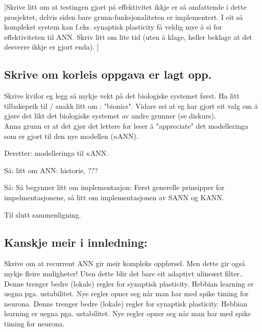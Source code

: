 
[Skrive litt om at testingen gjort på effektivitet ikkje er så omfattende i dette prosjektet, delvis siden bare grunn-funksjonaliteten er implementert.
I eit så komplekst system kan f.eks. synaptisk plasticity få veldig mye å si for effektiviteten til ANN. Skriv litt om lite tid (uten å klage, heller beklage at det desverre ikkje er gjort enda).
]

\subsection{Skrive om korleis oppgava er lagt opp.}
Skrive kvifor eg legg så mykje vekt på det biologiske systemet først. Ha litt tilbakepeik til / snakk litt om : "bionics". Vidare sei at eg har gjort eit valg om å gjøre det likt det biologiske systemet av andre grunner (se diskurs).\\
Anna grunn er at det gjør det lettere for leser å "appreciate" det modelleringa som er gjort til den nye modellen ($\kappa$ANN).

Deretter: modelleringa til $\kappa$ANN.

Så: litt om ANN: historie, ???

Så: Så begynner litt om implementasjon: Først generelle prinsipper for impelmentasjonene, så litt om implementasjonen av SANN og KANN.

Til slutt sammenligning.


\subsection{Kanskje meir i innledning:}

Skrive om at recurrent ANN gir meir kompleks oppførsel. Men dette gir også mykje fleire muligheter! Uten dette blir det bare eit adaptivt ulineært filter..
Denne trenger bedre (lokale) regler for synaptisk plasticity. Hebbian learning er uegna pga. ustabilitet. Nye regler opner seg når man har med spike timing for neurona. 
Denne trenger bedre (lokale) regler for synaptisk plasticity. Hebbian learning er uegna pga. ustabilitet. Nye regler opner seg når man har med spike timing for neurona. 

